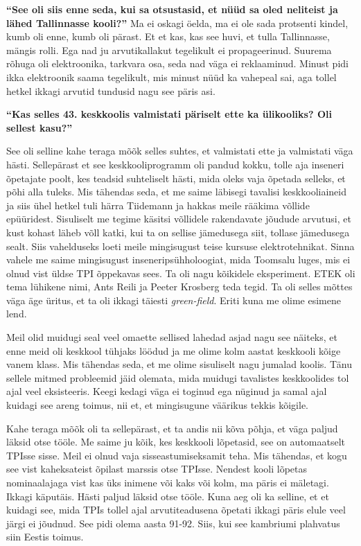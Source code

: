\textbf{\enquote{See oli siis enne seda, kui sa otsustasid, et nüüd sa oled 
neliteist ja lähed Tallinnasse kooli?}}
Ma ei oskagi öelda, ma ei ole sada protsenti kindel, kumb oli enne, kumb oli 
pärast. Et et kas, kas see huvi, et tulla Tallinnasse, mängis rolli. Ega nad ju 
arvutikallakut tegelikult ei propageerinud.  Suurema rõhuga oli  elektroonika, 
tarkvara osa, seda nad väga ei reklaaminud. Minust pidi ikka elektroonik saama 
tegelikult, mis minust nüüd ka vahepeal sai, aga tollel hetkel ikkagi arvutid 
tundusid nagu see päris asi. 

\textbf{\enquote{Kas selles 43. keskkoolis valmistati päriselt ette ka 
ülikooliks? Oli sellest kasu?}}

See oli selline kahe teraga mõõk selles suhtes, et valmistati ette ja 
valmistati väga hästi. Sellepärast et see keskkooliprogramm oli pandud kokku, 
tolle aja inseneri õpetajate poolt, kes teadsid suhteliselt hästi, mida oleks 
vaja õpetada selleks, et põhi alla tuleks. Mis tähendas seda, et me saime 
läbisegi  tavalisi keskkooliaineid ja siis ühel hetkel tuli härra 
Tiidemann ja hakkas meile rääkima võllide 
epüüridest. Sisuliselt me tegime käsitsi võllidele 
rakendavate jõudude arvutusi, et kust kohast läheb võll katki, kui ta on 
sellise jämedusega siit, tollase jämedusega sealt. Siis vahelduseks loeti meile 
mingisugust teise kursuse elektrotehnikat. Sinna vahele me saime mingisugust 
inseneripsühholoogiat, mida Toomsalu luges, mis ei 
olnud vist üldse TPI õppekavas sees. Ta oli nagu kõikidele eksperiment. 
ETEK  oli tema lühikene nimi, Ants Reili ja 
Peeter Krosberg teda tegid. Ta oli selles mõttes 
väga äge üritus, et ta oli ikkagi täiesti \emph{green-field}. Eriti kuna me 
olime esimene lend. 

Meil olid muidugi seal veel omaette sellised lahedad asjad nagu see näiteks, et 
enne meid oli keskkool tühjaks löödud ja me olime kolm aastat keskkooli kõige 
vanem klass. Mis tähendas seda, et me olime sisuliselt nagu jumalad koolis. 
Tänu sellele mitmed probleemid jäid olemata, mida muidugi tavalistes 
keskkoolides tol ajal veel eksisteeris. Keegi kedagi väga ei toginud ega 
nüginud ja samal ajal kuidagi see areng toimus, nii et, et mingisugune väärikus 
tekkis kõigile. 

Kahe teraga mõõk oli ta sellepärast, et ta andis nii kõva põhja, et väga paljud 
läksid otse tööle. Me saime ju kõik, kes keskkooli lõpetasid, see on 
automaatselt TPIsse sisse. Meil ei olnud vaja sisseastumiseksamit teha. Mis 
tähendas, et kogu see vist kaheksateist õpilast marssis otse TPIsse. Nendest 
kooli lõpetas nominaalajaga vist  kas üks inimene või kaks või kolm, ma päris 
ei mäletagi. Ikkagi käputäis. Hästi paljud läksid otse tööle. Kuna aeg oli ka 
selline, et et kuidagi see, mida TPIs tollel ajal arvutiteadusena õpetati 
ikkagi päris elule veel järgi ei jõudnud. See pidi olema aasta 91-92. Siis, kui 
see kambriumi plahvatus siin Eestis toimus.

